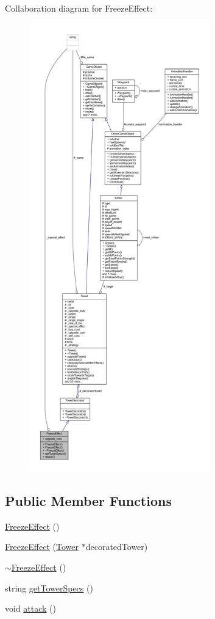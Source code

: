 Collaboration diagram for Freeze\+Effect\+:
\nopagebreak
\begin{figure}[H]
\begin{center}
\leavevmode
\includegraphics[height=550pt]{class_freeze_effect__coll__graph}
\end{center}
\end{figure}
\subsection*{Public Member Functions}
\begin{DoxyCompactItemize}
\item 
\hyperlink{class_freeze_effect_a3042708e66862a12cee75aa1945a2569}{Freeze\+Effect} ()
\item 
\hyperlink{class_freeze_effect_aa9aa4fc5b5a963f961c5250383977cdd}{Freeze\+Effect} (\hyperlink{class_tower}{Tower} $\ast$decorated\+Tower)
\item 
\hyperlink{class_freeze_effect_adb3bf2e848f3a5eccbece02f646a92a5}{$\sim$\+Freeze\+Effect} ()
\item 
string \hyperlink{class_freeze_effect_ace1230a2379fb2ec5894bcdf20e69ae9}{get\+Tower\+Specs} ()
\item 
void \hyperlink{class_freeze_effect_a6820f382c09080db9d8e5fbc26287f74}{attack} ()
\end{DoxyCompactItemize}
